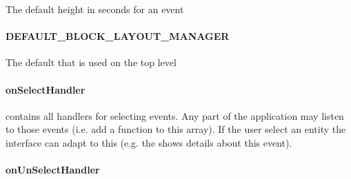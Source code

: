 \documentclass[letterpaper,10pt,english]{sphinxmanual}
\begin{document}
\begin{fulllineitems}
\label{ambrosia_web.event:DEFAULT_BLOCK_HEIGHT}
\end{fulllineitems}


The default height in seconds for an event


\paragraph{DEFAULT\_BLOCK\_LAYOUT\_MANAGER}
\label{ambrosia_web.event:default-block-layout-manager}

\begin{fulllineitems}
\label{ambrosia_web.event:DEFAULT_BLOCK_LAYOUT_MANAGER}
\end{fulllineitems}


The default {\hyperref[ambrosia_web.layout.BlockLayoutManager:ambrosia_web.layout.BlockLayoutManager]{}} that is used on the top level


\paragraph{onSelectHandler}
\label{ambrosia_web.event:onselecthandler}

\begin{fulllineitems}
\label{ambrosia_web.event:onSelectHandler}
\end{fulllineitems}


contains all handlers for selecting events. Any part of the application may listen to those events (i.e. add a
function to this array). If the user select an entity the interface can adapt to this (e.g. the
{\hyperref[ambrosia_web.view.detailsview.DetailsView:ambrosia_web.view.detailsview.DetailsView]{}} shows details about this event).


\paragraph{onUnSelectHandler}
\label{ambrosia_web.event:onunselecthandler}

\begin{fulllineitems}
\label{ambrosia_web.event:onUnSelectHandler}
\end{fulllineitems}
\end{document}
